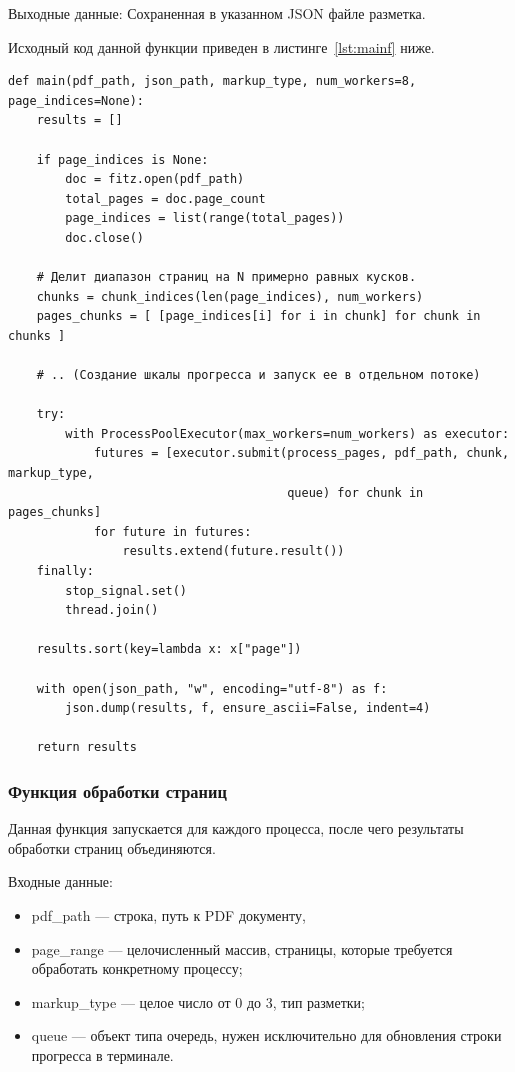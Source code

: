 Выходные данные: Сохраненная в указанном JSON файле разметка.

Исходный код данной функции приведен в листинге~\ref{lst:mainf} ниже.

\newpage

\begin{lstlisting}[caption={Точка входа, функция main}, label={lst:mainf}]
def main(pdf_path, json_path, markup_type, num_workers=8, page_indices=None):
    results = []

    if page_indices is None:
        doc = fitz.open(pdf_path)
        total_pages = doc.page_count
        page_indices = list(range(total_pages))
        doc.close()

    # Делит диапазон страниц на N примерно равных кусков.
    chunks = chunk_indices(len(page_indices), num_workers)
    pages_chunks = [ [page_indices[i] for i in chunk] for chunk in chunks ]

    # .. (Создание шкалы прогресса и запуск ее в отдельном потоке)

    try:
        with ProcessPoolExecutor(max_workers=num_workers) as executor:
            futures = [executor.submit(process_pages, pdf_path, chunk, markup_type,
                                       queue) for chunk in pages_chunks]
            for future in futures:
                results.extend(future.result())
    finally:
        stop_signal.set()
        thread.join()

    results.sort(key=lambda x: x["page"])

    with open(json_path, "w", encoding="utf-8") as f:
        json.dump(results, f, ensure_ascii=False, indent=4)

    return results
\end{lstlisting}

\subsubsection{Функция обработки страниц}

Данная функция запускается для каждого процесса, после чего результаты обработки страниц объединяются.

Входные данные:
\begin{itemize}
    \item pdf\_path --- строка, путь к PDF документу,
    \item page\_range --- целочисленный массив, страницы, которые требуется обработать конкретному процессу;
    \item markup\_type --- целое число от 0 до 3, тип разметки;
    \item queue --- объект типа очередь, нужен исключительно для обновления строки прогресса в терминале.
\end{itemize}

